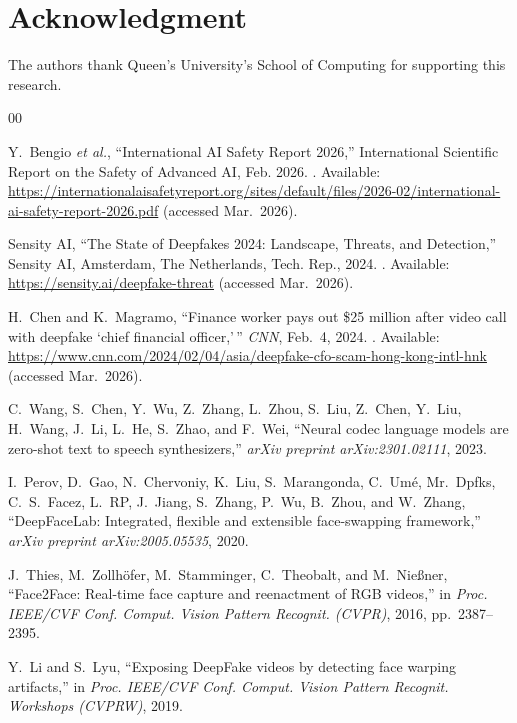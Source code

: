 \documentclass[conference]{IEEEtran}
\begin{document}
\section*{Acknowledgment}
The authors thank Queen's University's School of Computing for supporting this research.


\begin{thebibliography}{00}

Y.~Bengio \emph{et al.}, ``International {AI} Safety Report 2026,'' International Scientific Report on the Safety of Advanced {AI}, Feb. 2026.
\newblock [Online]. Available: \url{https://internationalaisafetyreport.org/sites/default/files/2026-02/international-ai-safety-report-2026.pdf} (accessed Mar.~2026).

Sensity AI, ``The State of Deepfakes 2024: Landscape, Threats, and Detection,'' Sensity AI, Amsterdam, The Netherlands, Tech. Rep., 2024.
\newblock [Online]. Available: \url{https://sensity.ai/deepfake-threat} (accessed Mar.~2026).

H.~Chen and K.~Magramo, ``Finance worker pays out \$25 million after video call with deepfake `chief financial officer,'\,'' \emph{CNN}, Feb.~4, 2024.
\newblock [Online]. Available: \url{https://www.cnn.com/2024/02/04/asia/deepfake-cfo-scam-hong-kong-intl-hnk} (accessed Mar.~2026).

C.~Wang, S.~Chen, Y.~Wu, Z.~Zhang, L.~Zhou, S.~Liu, Z.~Chen, Y.~Liu, H.~Wang, J.~Li, L.~He, S.~Zhao, and F.~Wei, ``Neural codec language models are zero-shot text to speech synthesizers,'' \emph{arXiv preprint arXiv:2301.02111}, 2023.

I.~Perov, D.~Gao, N.~Chervoniy, K.~Liu, S.~Marangonda, C.~Um\'{e}, Mr.~Dpfks, C.~S.~Facez, L.~RP, J.~Jiang, S.~Zhang, P.~Wu, B.~Zhou, and W.~Zhang, ``{DeepFaceLab}: Integrated, flexible and extensible face-swapping framework,'' \emph{arXiv preprint arXiv:2005.05535}, 2020.

J.~Thies, M.~Zollh\"{o}fer, M.~Stamminger, C.~Theobalt, and M.~Nie{\ss}ner, ``{Face2Face}: Real-time face capture and reenactment of {RGB} videos,'' in \emph{Proc. IEEE/CVF Conf. Comput. Vision Pattern Recognit. (CVPR)}, 2016, pp.~2387--2395.

Y.~Li and S.~Lyu, ``Exposing {DeepFake} videos by detecting face warping artifacts,'' in \emph{Proc. IEEE/CVF Conf. Comput. Vision Pattern Recognit. Workshops (CVPRW)}, 2019.


\end{thebibliography}
\end{document}
